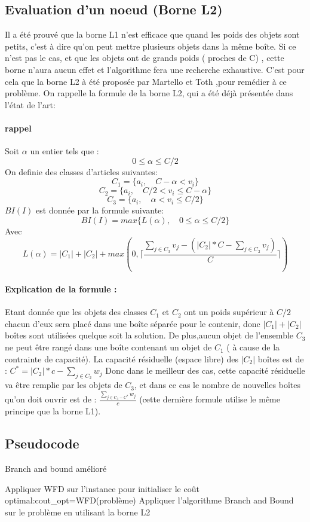 \documentclass[12pt]{article}
\begin{document}
\subsection{Evaluation d'un noeud (Borne L2)}
Il a été prouvé que la borne L1 n’est efficace que quand les poids des objets sont petits, c’est à dire qu’on peut mettre plusieurs objets dans la même boîte. Si ce n’est pas le cas, et que les objets ont de grands poids ( proches de C) , cette borne n’aura aucun effet et l’algorithme fera une recherche exhaustive. 
C’est pour cela que la borne L2 à été proposée par Martello et Toth ,pour remédier à ce problème. 
On rappelle la formule de la borne L2, qui a été déjà présentée dans l’état de l’art:
\paragraph{rappel}
Soit \(\alpha\) un entier tels que :
\[0 \le \alpha \le C/2\]
On definie des classes d'articles suivantes: 
\[C_1 = \{a_i, \quad C-\alpha < v_i\} \]
\[C_2 = \{a_i, \quad C/2 < v_i \le C-\alpha\} \]
\[C_3 = \{a_i, \quad \alpha < v_i \le C/2\} \]
\(BI(I)\)  est donnée par la formule suivante:
\[BI(I)=max\{L(\alpha),\quad 0 \le \alpha \le C/2\}\]
Avec
\[L(\alpha)=|C_1|+|C_2|+max(0, \lceil{\frac{\sum_{j \in C_3}^{} v_j - (|C_2|*C - \sum_{j \in C_2}^{} v_j) }{C}}\rceil)\]
\paragraph{Explication de la formule :}
Etant donnée que les objets des classes $C_1$ et $C_2$ ont un poids supérieur à $C/2$ chacun d'eux sera placé dans une boîte séparée pour le contenir, donc
$|C_1|+|C_2|$boîtes sont utilisées quelque soit la solution. De plus,aucun objet de l’ensemble $C_3$ ne peut être rangé dans une boîte contenant un objet de $C_1$ ( à cause de la contrainte de capacité). La capacité résiduelle (espace libre) des
$|C_2|$ boîtes est de : $C^*=|C_2|*c-\sum_{j \in C_2}^{} w_j$
Donc dans le meilleur des cas, cette capacité résiduelle va être remplie par les objets de $C_3$, et dans ce cas le nombre de nouvelles boîtes qu’on doit ouvrir est de :  
$\frac{\sum_{j \in C_3 -C^*}^{} w_j}{c}$ (cette dernière formule utilise le même principe que la borne L1).
\subsection{Pseudocode}
\begin{algorithm}[H]
   \caption{Branch and bound amélioré }
   \begin{algorithmic} 
   \STATE Appliquer WFD sur l’instance pour initialiser le coût optimal:\linebreak cout\_opt=WFD(problème)
   \STATE Appliquer l’algorithme Branch and Bound sur le problème en utilisant la borne L2
   \end{algorithmic} 
\end{algorithm}
\end{document}
